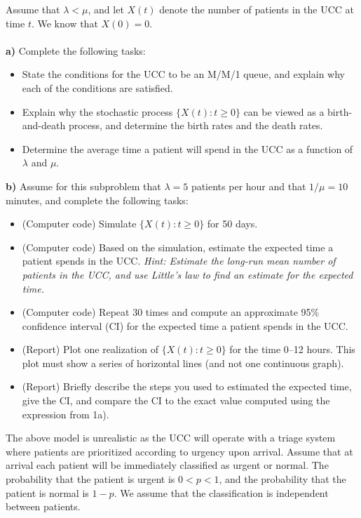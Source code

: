 \documentclass[1p]{article}		%
\begin{document}
Assume that $\lambda < \mu$, and let $X(t)$ denote the number of patients in the UCC at time
$t$. We know that $X(0) = 0$.\\\\
\textbf{a)} Complete the following tasks:
\begin{itemize}
  \item State the conditions for the UCC to be an M/M/1 queue, and explain why each of
  the conditions are satisfied.
  \item Explain why the stochastic process
$\{X(t): t\geq 0\}$ can be viewed as a birth-and-death process, and determine the birth rates
and the death rates.
  \item Determine the average time a patient will spend in the UCC as a function
  of $\lambda$ and $\mu$.
\end{itemize}
\textbf{b)} Assume for this subproblem that $\lambda = 5$ patients per hour and
that $1/\mu = 10$ minutes, and complete the following tasks:
\begin{itemize}
  \item (Computer code) Simulate $\{X(t): t\geq 0\}$ for 50 days.
  \item (Computer code) Based on the simulation, estimate the expected time a patient spends in the UCC. \emph{Hint: Estimate the long-run mean number of patients in the UCC, and use Little's law to find an estimate for the expected time.}
  \item (Computer code) Repeat 30 times and compute an approximate 95\% confidence interval (CI)
  for the expected time a patient spends in the UCC.
  \item (Report) Plot one realization of $\{X(t): t \geq 0\}$ for the time 0--12 hours. This plot must show a series of horizontal lines (and not one continuous graph).
  \item (Report) Briefly describe the steps you used to estimated the expected time, give the CI, and compare the CI to the exact value computed using the expression from 1a).
\end{itemize}

\noindent
The above model is unrealistic as the UCC will operate with a triage system where
patients are prioritized according to urgency upon arrival. 
Assume that at arrival each patient will be immediately classified as urgent or normal.
The probability that the patient is urgent is $0 < p < 1$, and the probability
that the patient is normal is $1-p$. We assume that the classification is independent
between patients.
\end{document}
